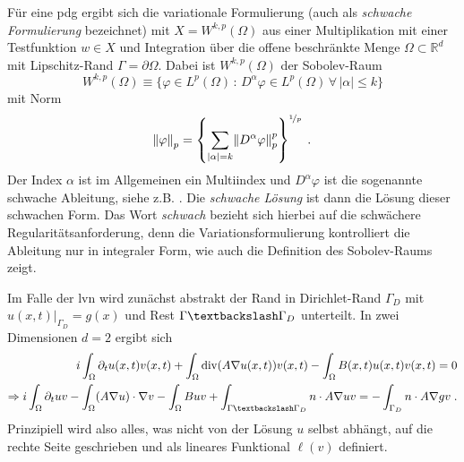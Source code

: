  Für eine \ac{pdg} ergibt sich die variationale Formulierung (auch als \emph{schwache Formulierung} bezeichnet) mit ${X=W^{k,p}(\Omega)}$ aus einer Multiplikation mit einer Testfunktion ${w\in X}$ und Integration über die offene beschränkte Menge ${\Omega \subset \mathbb{R}^d}$ mit Lipschitz-Rand $\Gamma = \partial\Omega$.
 Dabei ist ${W^{k,p}(\Omega)}$ der Sobolev-Raum
 \begin{equation}
   W^{k,p}(\Omega) \equiv \{ \varphi \in L^p(\Omega) \, : \, D^{\alpha}\varphi \in L^p(\Omega) \, \forall \, |\alpha| \leq k\}
   \label{eq:sobolevraum}
 \end{equation}
 mit Norm
 \begin{equation*}
   \norm{\varphi}_p = \left\{ \sum_{|\alpha|=k}\norm{D^{\alpha}\varphi}_p^p\right\}^{\nicefrac{1}{p}} \; .
 \end{equation*}
 Der Index $\alpha$ ist im Allgemeinen ein Multiindex und $D^{\alpha}\varphi$ ist die sogenannte schwache Ableitung, siehe z.B. \cite{brenner2007mathematical}.  Die \emph{schwache Lösung} ist dann die Lösung dieser schwachen Form. Das Wort \emph{schwach} bezieht sich hierbei auf die schwächere Regularitätsanforderung, denn die Variationsformulierung kontrolliert die Ableitung nur in integraler Form, wie auch die Definition des Sobolev-Raums zeigt.

 Im Falle der \ac{lvn} wird zunächst abstrakt der Rand in Dirichlet-Rand $\Gamma_D$ mit ${u(x,t)|_{\Gamma_D} = g(x)}$ und Rest ${\Gamma\textbackslash\Gamma_D}$ unterteilt. In zwei Dimensionen $d=2$ ergibt sich
 \begin{align*}
              i \int_{\Omega} \partial_t u(x,t) v(x,t) + \int_{\Omega}\operatorname{div}(A\nabla u(x,t)) v(x,t) - \int_{\Omega}B(x,t) u(x,t) v(x,t) = 0 \\
  \Rightarrow i \int_{\Omega} \partial_t u v - \int_{\Omega}(A\nabla u)\cdot\nabla v - \int_{\Omega}B u v + \int_{\Gamma\textbackslash\Gamma_D} n \cdot A\nabla u v = - \int_{\Gamma_D} n \cdot A\nabla g v \; .
\end{align*}
 Prinzipiell wird also alles, was nicht von der Lösung $u$ selbst abhängt, auf die rechte Seite geschrieben und als lineares Funktional $\ell(v)$ definiert.

